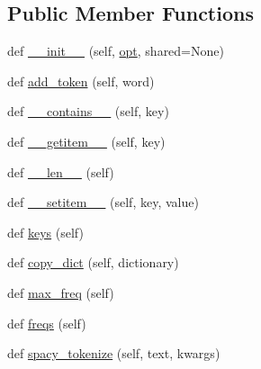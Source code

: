 \subsection*{Public Member Functions}
\begin{DoxyCompactItemize}
\item 
def \hyperlink{classparlai_1_1agents_1_1legacy__agents_1_1seq2seq_1_1dict__v0_1_1DictionaryAgent_ace91e7215f1a4688abaa3235e2c19d56}{\+\_\+\+\_\+init\+\_\+\+\_\+} (self, \hyperlink{classparlai_1_1agents_1_1legacy__agents_1_1seq2seq_1_1dict__v0_1_1DictionaryAgent_a1b0adc4fc487db550d89f6f7cd7c576a}{opt}, shared=None)
\item 
def \hyperlink{classparlai_1_1agents_1_1legacy__agents_1_1seq2seq_1_1dict__v0_1_1DictionaryAgent_abd9065c5c2862e81e3a1edb221ec7491}{add\+\_\+token} (self, word)
\item 
def \hyperlink{classparlai_1_1agents_1_1legacy__agents_1_1seq2seq_1_1dict__v0_1_1DictionaryAgent_ac5b925ffaabf30466d54176a80ae783c}{\+\_\+\+\_\+contains\+\_\+\+\_\+} (self, key)
\item 
def \hyperlink{classparlai_1_1agents_1_1legacy__agents_1_1seq2seq_1_1dict__v0_1_1DictionaryAgent_a09fc8bfa07769eaa59f5d7b7fef95b72}{\+\_\+\+\_\+getitem\+\_\+\+\_\+} (self, key)
\item 
def \hyperlink{classparlai_1_1agents_1_1legacy__agents_1_1seq2seq_1_1dict__v0_1_1DictionaryAgent_a7cf7b736b38ff48f666e0b713328d568}{\+\_\+\+\_\+len\+\_\+\+\_\+} (self)
\item 
def \hyperlink{classparlai_1_1agents_1_1legacy__agents_1_1seq2seq_1_1dict__v0_1_1DictionaryAgent_af234fbce75cd277f03b20688f7ba0e52}{\+\_\+\+\_\+setitem\+\_\+\+\_\+} (self, key, value)
\item 
def \hyperlink{classparlai_1_1agents_1_1legacy__agents_1_1seq2seq_1_1dict__v0_1_1DictionaryAgent_a6f403715cffdfde531b83a9bf6e0f750}{keys} (self)
\item 
def \hyperlink{classparlai_1_1agents_1_1legacy__agents_1_1seq2seq_1_1dict__v0_1_1DictionaryAgent_a56e9c7a8f20652b9dff0fc3c495b6dcf}{copy\+\_\+dict} (self, dictionary)
\item 
def \hyperlink{classparlai_1_1agents_1_1legacy__agents_1_1seq2seq_1_1dict__v0_1_1DictionaryAgent_a390adb45c505b2b35d3bd3e67aa301ee}{max\+\_\+freq} (self)
\item 
def \hyperlink{classparlai_1_1agents_1_1legacy__agents_1_1seq2seq_1_1dict__v0_1_1DictionaryAgent_a651f3045cd1e5237e7e5a1b54cc5f1c9}{freqs} (self)
\item 
def \hyperlink{classparlai_1_1agents_1_1legacy__agents_1_1seq2seq_1_1dict__v0_1_1DictionaryAgent_a1064af1b19fec27e689ccd414e450e06}{spacy\+\_\+tokenize} (self, text, kwargs)

\end{DoxyCompactItemize}
